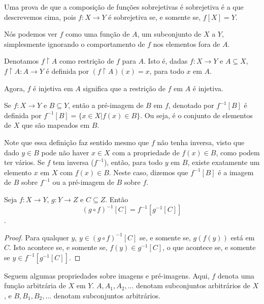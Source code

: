 Uma prova de que a composição de funções sobrejetivas é 
sobrejetiva é a que descrevemos cima, pois $f: X \to Y$ é 
sobrejetiva se, e somente se, $f[X] = Y$. 

Nós podemos ver $f$ como uma função de $A$, um subconjunto de $X$ a $Y$, simplesmente 
ignorando o comportamento de $f$ nos elementos fora de $A$. 

\begin{definition}
    \label{def9}
    Denotamos $f \upharpoonright A$ como restrição de $f$ para $A$. Isto é, dadas $f: X \to Y$ 
    e $A \subseteq X$, $f \upharpoonright A : A \to Y$ é definida por $(f \upharpoonright A)(x) = x$, 
    para todo $x$ em $A$. 
\end{definition}

Agora, $f$ é injetiva em $A$ significa que a restrição de $f$ em $A$ é injetiva.

\begin{definition}
    \label{def10}
    Se $f: X \to Y$ e $B \subseteq Y$, então a pré-imagem de $B$ em $f$, denotado por $f^{-1}[B]$ é
    definida por $f^{-1}[B] = \{x \in X | f(x) \in B\}$. Ou seja, é o conjunto de elementos de $X$ que 
    são mapeados em $B$.
\end{definition}

Note que essa definição faz sentido mesmo que $f$ não tenha inversa, visto que dado $y \in B$ pode não 
haver $x \in X$ com a propriedade de $f(x) \in B$, como podem ter vários. Se $f$ tem inversa ($f^{-1}$), 
então, para todo $y$ em $B$, existe exatamente um elemento $x$ em $X$ com $f(x) \in B$. Neste caso, 
dizemos que $f^{-1}[B]$ é a imagem de $B$ sobre $f^{-1}$ ou a pré-imagem de $B$ sobre $f$. 

\begin{theorem}
    Seja $f: X \to Y$, $g: Y \to Z$ e $C \subseteq Z$. Então $$(g \circ f)^{-1}[C] = f^{-1}[g^{-1}[C]]$$.
\end{theorem}
\begin{proof}
    Para qualquer $y$, $y \in (g \circ f)^{-1}[C]$ se, e somente se, $g(f(y))$ está em $C$. 
    Isto acontece se, e somente se, $f(y) \in g^{-1}[C]$, o que acontece se, e somente se $y \in f^{-1}[g^{-1}[C]]$.
\end{proof}

Seguem algumas propriedades sobre imagens e pré-imagens. Aqui, $f$ denota uma função
arbitrária de $X$ em $Y$. $A, A_1, A_2, ...$ denotam subconjuntos arbitrários de $X$, 
e $B, B_1, B_2,...$ denotam subconjuntos arbitrários. 

